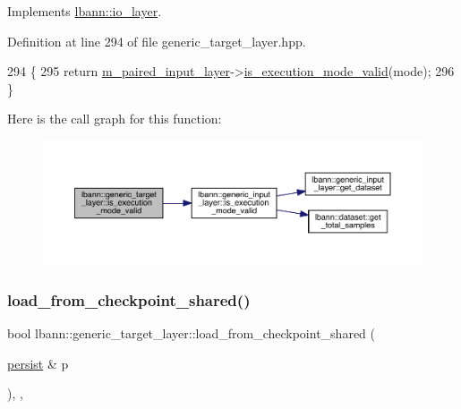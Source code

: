 Implements \hyperlink{classlbann_1_1io__layer_a37e2f77a99ee44106ac7d9fd3a275dcc}{lbann\+::io\+\_\+layer}.



Definition at line 294 of file generic\+\_\+target\+\_\+layer.\+hpp.


\begin{DoxyCode}
294                                                                    \{
295     \textcolor{keywordflow}{return} \hyperlink{classlbann_1_1generic__target__layer_a84da1260e9feb4fbc3e6f2315e4cab4b}{m\_paired\_input\_layer}->\hyperlink{classlbann_1_1generic__input__layer_a31082076a8aad937eef3cadc0b5e1b27}{is\_execution\_mode\_valid}(mode);
296   \}
\end{DoxyCode}
Here is the call graph for this function\+:\nopagebreak
\begin{figure}[H]
\begin{center}
\leavevmode
\includegraphics[width=350pt]{classlbann_1_1generic__target__layer_a0ae18b3b410c3b6c1a5b34a3547ba4c5_cgraph}
\end{center}
\end{figure}
\mbox{\label{classlbann_1_1generic__target__layer_af7d73f9e77b99b6a8b204cbda512726f}} 
\subsubsection{\texorpdfstring{load\+\_\+from\+\_\+checkpoint\+\_\+shared()}{load\_from\_checkpoint\_shared()}}
{\footnotesize\ttfamily bool lbann\+::generic\+\_\+target\+\_\+layer\+::load\+\_\+from\+\_\+checkpoint\+\_\+shared (\begin{DoxyParamCaption}\item[{\hyperlink{classlbann_1_1persist}{persist} \&}]{p }\end{DoxyParamCaption})\hspace{0.3cm}{\ttfamily [inline]}, {\ttfamily [override]}, {\ttfamily [virtual]}}



